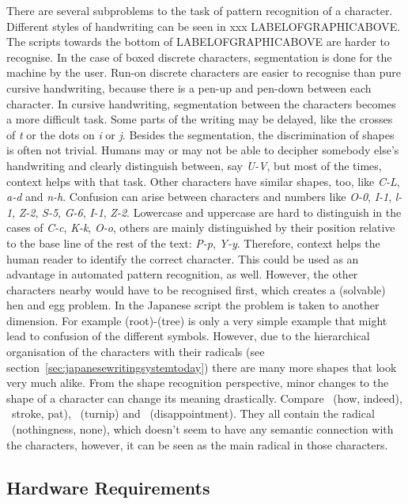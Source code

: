 There are several subproblems to the task of pattern recognition of a character.
Different styles of handwriting can be seen in xxx LABELOFGRAPHICABOVE. 
The scripts towards the bottom of LABELOFGRAPHICABOVE are harder to recognise. 
In the case of boxed discrete characters, segmentation is done for the 
machine by the user. Run-on discrete characters are easier to recognise 
than pure cursive handwriting, because there is a pen-up and 
pen-down between each character. In cursive handwriting, segmentation 
between the characters becomes a more difficult task. Some parts of the writing
may be delayed, like the crosses of \emph{t} or the dots on \emph{i} or \emph{j}.
Besides the segmentation, the discrimination of shapes is often not trivial.
Humans may or may not be able to decipher somebody else's handwriting and clearly
distinguish between, say \emph{U-V}, but most of the times, context helps with 
that task. Other characters have similar shapes, too, like \emph{C-L}, \emph{a-d}
and \emph{n-h}. Confusion can arise between characters and numbers like 
\emph{O-0}, \emph{I-1}, \emph{l-1}, \emph{Z-2}, \emph{S-5}, \emph{G-6}, 
\emph{I-1}, \emph{Z-2}. Lowercase and uppercase are hard to distinguish in the
cases of \emph{C-c}, \emph{K-k}, \emph{O-o}, others are mainly distinguished 
by their position relative to the base line of the rest of the text: 
\emph{P-p}, \emph{Y-y}. Therefore, context helps the human reader to identify
the correct character. This could be used as an advantage in automated pattern
recognition, as well. However, the other characters nearby would have to be
recognised first, which creates a (solvable) hen and egg problem.
In the Japanese script the problem is taken to another dimension. 
For example (root)-(tree) is only a very simple example 
that might lead to confusion of the different symbols. However, due to the 
hierarchical organisation of the characters with their radicals
(see section~\ref{sec:japanesewritingsystemtoday}) there are many more shapes 
that look very much alike. From the shape recognition perspective, 
minor changes to the shape of a character can change its meaning drastically.
Compare ~(how, indeed), ~stroke, pat), ~(turnip) and
~(disappointment). They all contain the radical 
~(nothingness, none), which doesn't seem to have any semantic connection
with the characters, however, it can be seen as the main radical in those 
characters.

\subsection{Hardware Requirements}
\label{sec:hardwarerequirements}

